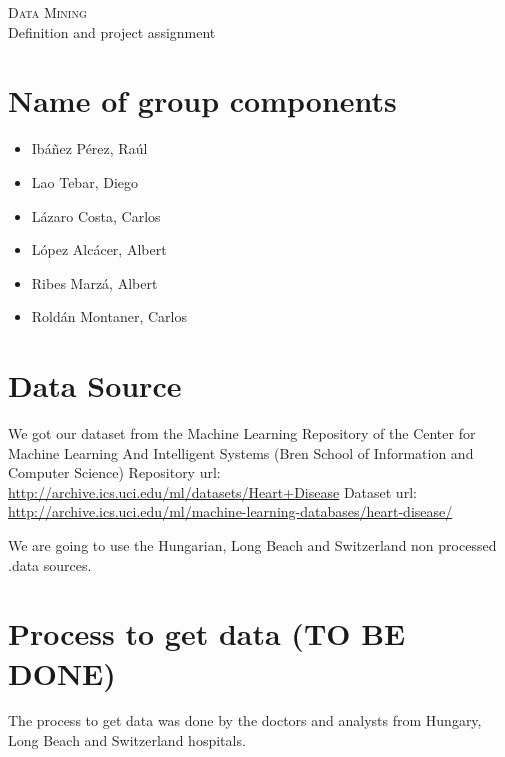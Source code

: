 \documentclass[a4paper,12pt]{article}
\begin{document}
\begin{center}
    \huge{\textsc{Data Mining} \\ Definition and project assignment}
\end{center}


%

\section{Name of group components}

    \begin{itemize}
    
        \item Ibáñez Pérez, Raúl
        \item Lao Tebar, Diego
        \item Lázaro Costa, Carlos
        \item López Alcácer, Albert
        \item Ribes Marzá, Albert
        \item Roldán Montaner, Carlos

    \end{itemize}

\section{Data Source}

    We got our dataset from the Machine Learning Repository of the Center for Machine Learning And Intelligent Systems (Bren School of Information and Computer Science)\newline
    Repository url: \url{http://archive.ics.uci.edu/ml/datasets/Heart+Disease}\newline
    Dataset url: \url{http://archive.ics.uci.edu/ml/machine-learning-databases/heart-disease/} \newline

    We are going to use the Hungarian, Long Beach and Switzerland non processed .data sources.

\section{Process to get data (\textbf{TO BE DONE})}
    The process to get data was done by the doctors and analysts from Hungary, Long Beach and Switzerland hospitals.
    
\end{document}
